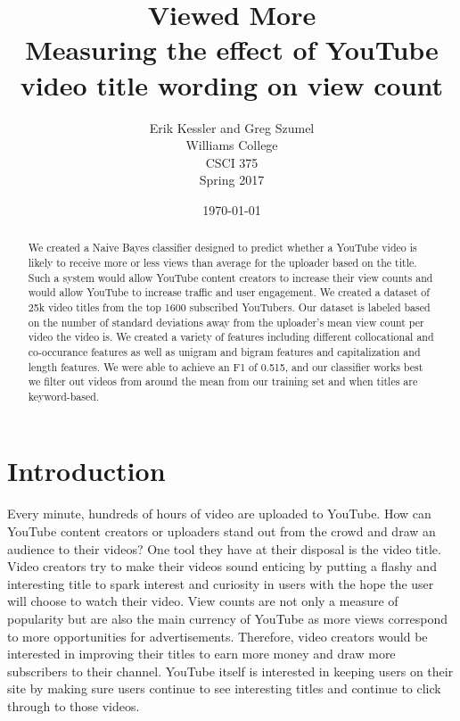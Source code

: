 \documentclass[a4paper,12pt]{article}
\begin{document}
\thispagestyle{plain}
\pagestyle{fancy}
\clearpage
\setlength{\headsep}{0.4in}

\title{Viewed More\\ \large Measuring the effect of YouTube video title wording on view count}
\date{\today}
\author{
  {\rm Erik Kessler and Greg Szumel}\\
  Williams College\\
  CSCI 375 \\
  Spring 2017
}

\maketitle

\cfoot{\thepage}

\begin{abstract}
We created a Naive Bayes classifier designed to predict whether a YouTube video is likely to receive more or less views than average for the uploader based on the title. Such a system would allow YouTube content creators to increase their view counts and would allow YouTube to increase traffic and user engagement. We created a dataset of 25k video titles from the top 1600 subscribed YouTubers. Our dataset is labeled based on the number of standard deviations away from the uploader's mean view count per video the video is. We created a variety of features including different collocational and co-occurance features as well as unigram and bigram features and capitalization and length features. We were able to achieve an F1 of 0.515, and our classifier works best we filter out videos from around the mean from our training set and when titles are keyword-based. 
\end{abstract}


\section{Introduction}
Every minute, hundreds of hours of video are uploaded to YouTube. How can YouTube content creators or uploaders stand out from the crowd and draw an audience to their videos? One tool they have at their disposal is the video title. Video creators try to make their videos sound enticing by putting a flashy and interesting title to spark interest and curiosity in users with the hope the user will choose to watch their video. View counts are not only a measure of popularity but are also the main currency of YouTube as more views correspond to more opportunities for advertisements. Therefore, video creators would be interested in improving their titles to earn more money and draw more subscribers to their channel. YouTube itself is interested in keeping users on their site by making sure users continue to see interesting titles and continue to click through to those videos.
\end{document}
